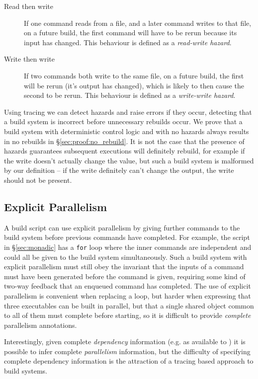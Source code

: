 \begin{description}
\item[Read then write] If one command reads from a file, and a later command writes to that file, on a future build, the first command will have to be rerun because its input has changed. This behaviour is defined as a \emph{read-write hazard}.
\item[Write then write] If two commands both write to the same file, on a future build, the first will be rerun (it's output has changed), which is likely to then cause the second to be rerun. This behaviour is defined as a \emph{write-write hazard}.
\end{description}

Using tracing we can detect hazards and raise errors if they occur, detecting that a build system is incorrect before unnecessary rebuilds occur. We prove that a build system with deterministic control logic and with no hazards always results in no rebuilds in \S\ref{sec:proof:no_rebuild}. It is not the case that the presence of hazards guarantees subsequent executions will definitely rebuild, for example if the write doesn't actually change the value, but such a build system is malformed by our definition -- if the write definitely can't change the output, the write should not be present.

\subsection{Explicit Parallelism}
\label{sec:explicit_parallelism}

A build script can use explicit parallelism by giving further commands to the build system before previous commands have completed. For example, the script in \S\ref{sec:monadic} has a \texttt{for} loop where the inner commands are independent and could all be given to the build system simultaneously. Such a build system with explicit parallelism must still obey the invariant that the inputs of a command must have been generated before the command is given, requiring some kind of two-way feedback that an enqueued command has completed. The use of explicit parallelism is convenient when replacing a loop, but harder when expressing that three executables can be built in parallel, but that a single shared object common to all of them must complete before starting, so it is difficult to provide \emph{complete} parallelism annotations.

Interestingly, given complete \emph{dependency} information (e.g. as available to \Make) it is possible to infer complete \emph{parallelism} information, but the difficulty of specifying complete dependency information is the attraction of a tracing based approach to build systems.

